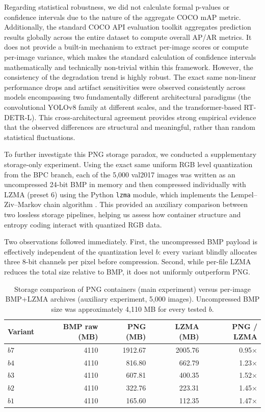 \documentclass[12pt, a4paper]{article}
\begin{document}
Regarding statistical robustness, we did not calculate formal p-values or confidence intervals due to the nature of the aggregate COCO mAP metric. Additionally, the standard COCO API evaluation toolkit aggregates prediction results globally across the entire dataset to compute overall AP/AR metrics. It does not provide a built-in mechanism to extract per-image scores or compute per-image variance, which makes the standard calculation of confidence intervals mathematically and technically non-trivial within this framework. However, the consistency of the degradation trend is highly robust. The exact same non-linear performance drops and artifact sensitivities were observed consistently across models encompassing two fundamentally different architectural paradigms (the convolutional YOLOv8 family at different scales, and the transformer-based RT-DETR-L). This cross-architectural agreement provides strong empirical evidence that the observed differences are structural and meaningful, rather than random statistical fluctuations.

To further investigate this PNG storage paradox, we conducted a supplementary storage-only experiment. Using the exact same uniform RGB level quantization from the BPC branch, each of the 5,000 val2017 images was written as an uncompressed 24-bit BMP in memory and then compressed individually with LZMA (preset 6) using the Python \texttt{lzma} module, which implements the Lempel--Ziv--Markov chain algorithm \cite{pavlov2013}. This provided an auxiliary comparison between two lossless storage pipelines, helping us assess how container structure and entropy coding interact with quantized RGB data.

Two observations followed immediately. First, the uncompressed BMP payload is effectively independent of the quantization level $b$: every variant blindly allocates three 8-bit channels per pixel before compression. Second, while per-file LZMA reduces the total size relative to BMP, it does not uniformly outperform PNG.

\begin{table}[htbp]
\centering
\caption{Storage comparison of PNG containers (main experiment) versus per-image BMP+LZMA archives (auxiliary experiment, 5,000 images). Uncompressed BMP size was approximately 4,110 MB for every tested $b$.}
\label{tab:lzma_png_storage}
\begin{tabular}{|l|r|r|r|r|}
\hline
\textbf{Variant} & \textbf{BMP raw (MB)} & \textbf{PNG (MB)} & \textbf{LZMA (MB)} & \textbf{PNG / LZMA} \\ \hline
$b7$ & 4110 & 1912.67 & 2005.76 & 0.95$\times$ \\ \hline
$b4$ & 4110 & 816.80 & 662.79 & 1.23$\times$ \\ \hline
$b3$ & 4110 & 607.81 & 400.35 & 1.52$\times$ \\ \hline
$b2$ & 4110 & 322.76 & 223.31 & 1.45$\times$ \\ \hline
$b1$ & 4110 & 165.60 & 112.35 & 1.47$\times$ \\ \hline
\end{tabular}
\end{table}
\end{document}
